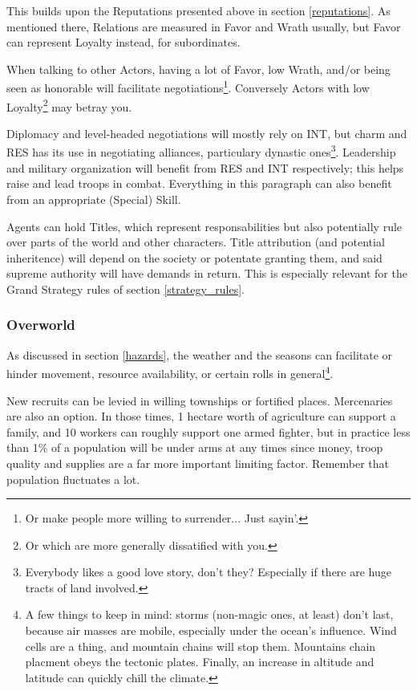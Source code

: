 \label{relations}

This builds upon the Reputations presented above in section \ref{reputations}. As mentioned there, Relations are measured in Favor and Wrath usually, but Favor can represent Loyalty instead, for subordinates.

When talking to other Actors, having a lot of Favor, low Wrath, and/or being seen as honorable will facilitate negotiations\footnote{Or make people more willing to surrender... Just sayin'.}. Conversely Actors with low Loyalty\footnote{Or which are more generally dissatified with you.} may betray you.

Diplomacy and level-headed negotiations will mostly rely on INT, but charm and RES has its use in negotiating alliances, particulary dynastic ones\footnote{Everybody likes a good love story, don't they? Especially if there are huge tracts of land involved.}. Leadership and military organization will benefit from RES and INT respectively; this helps raise and lead troops in combat. Everything in this paragraph can also benefit from an appropriate (Special) Skill.

Agents can hold Titles, which represent responsabilities but also potentially rule over parts of the world and other characters. Title attribution (and potential inheritence) will depend on the society or potentate granting them, and said supreme authority will have demands in return. This is especially relevant for the Grand Strategy rules of section \ref{strategy_rules}.



\subsubsection{Overworld}



As discussed in section \ref{hazards}, the weather and the seasons can facilitate or hinder movement, resource availability, or certain rolls in general\footnote{A few things to keep in mind: storms (non-magic ones, at least) don't last, because air masses are mobile, especially under the ocean's influence. Wind cells are a thing, and mountain chains will stop them. Mountains chain placment obeys the tectonic plates. Finally, an increase in altitude and latitude can quickly chill the climate.}. 

New recruits can be levied in willing townships or fortified places. Mercenaries are also an option. In those times, 1 hectare worth of agriculture can support a family, and 10 workers can roughly support one armed fighter, but in practice less than 1\% of a population will be under arms at any times since money, troop quality and supplies are a far more important limiting factor. Remember that population fluctuates a lot.

